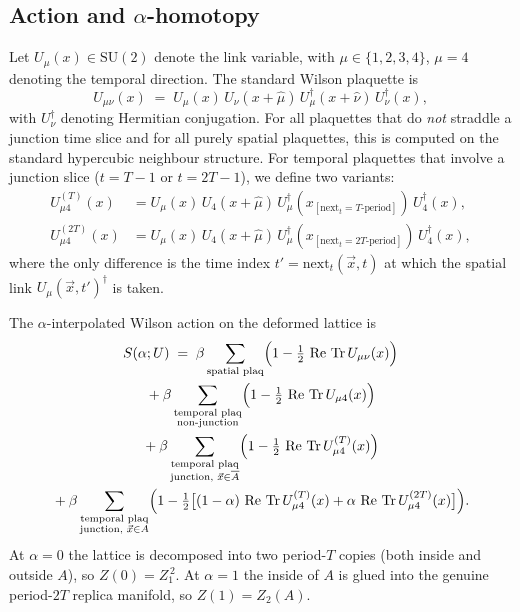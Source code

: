 \documentclass[11pt,a4paper]{article}
\theoremstyle{definition}
\newcommand{\bA}{\overline{A}}
\newcommand{\Tr}{\operatorname{Tr}}
\renewcommand{\Re}{\operatorname{Re}}
\newcommand{\half}{\tfrac{1}{2}}
\newcommand{\SUtwo}{\mathrm{SU}(2)}
\begin{document}
\subsection{Action and $\alpha$-homotopy}
\label{sec:action}

Let $U_\mu(x) \in \SUtwo$ denote the link variable, with $\mu \in
\{1,2,3,4\}$, $\mu = 4$ denoting the temporal direction. The standard
Wilson plaquette is
\begin{equation}
   U_{\mu\nu}(x) \;=\; U_\mu(x)\,U_\nu(x+\hat\mu)\,U_\mu^\dagger(x+\hat\nu)\,U_\nu^\dagger(x),
\end{equation}
with $U_\nu^\dagger$ denoting Hermitian conjugation. For all
plaquettes that do \emph{not} straddle a junction time slice and for
all purely spatial plaquettes, this is computed on the standard
hypercubic neighbour structure. For temporal plaquettes that involve
a junction slice ($t = T-1$ or $t = 2T-1$), we define two variants:
\begin{align}
   U^{(T)}_{\mu 4}(x) &= U_\mu(x)\,U_4(x + \hat\mu)\,
                        U_\mu^\dagger(x_{[\mathrm{next}_t = T\text{-period}]})\,
                        U_4^\dagger(x), \\
   U^{(2T)}_{\mu 4}(x) &= U_\mu(x)\,U_4(x + \hat\mu)\,
                        U_\mu^\dagger(x_{[\mathrm{next}_t = 2T\text{-period}]})\,
                        U_4^\dagger(x),
\end{align}
where the only difference is the time index $t' = \mathrm{next}_t(\vec
x, t)$ at which the spatial link $U_\mu(\vec x, t')^\dagger$ is taken.

The $\alpha$-interpolated Wilson action on the deformed lattice is
\begin{multline}
   S(\alpha; U) \;=\; \beta \sum_{\text{spatial plaq}}
          \Bigl(1 - \half\,\Re\,\Tr U_{\mu\nu}(x)\Bigr) \\
   {} + \beta \sum_{\substack{\text{temporal plaq}\\\text{non-junction}}}
          \Bigl(1 - \half\,\Re\,\Tr U_{\mu 4}(x)\Bigr) \\
   {} + \beta \sum_{\substack{\text{temporal plaq}\\\text{junction, } \vec x \in \bA}}
          \Bigl(1 - \half\,\Re\,\Tr U^{(T)}_{\mu 4}(x)\Bigr) \\
   {} + \beta \sum_{\substack{\text{temporal plaq}\\\text{junction, } \vec x \in A}}
          \Bigl(1 - \half \bigl[(1-\alpha)\,\Re\,\Tr U^{(T)}_{\mu 4}(x)
                                + \alpha\,\Re\,\Tr U^{(2T)}_{\mu 4}(x)\bigr]\Bigr).
   \label{eq:S-alpha}
\end{multline}
At $\alpha = 0$ the lattice is decomposed into two period-$T$ copies
(both inside and outside $A$), so $Z(0) = Z_1^{\,2}$. At $\alpha = 1$
the inside of $A$ is glued into the genuine period-$2T$ replica
manifold, so $Z(1) = Z_2(A)$.
\end{document}
